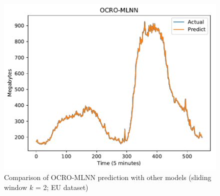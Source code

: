 \documentclass[11pt,twoside]{article}
\begin{document}
\begin{multicols}{2}
\begin{figure}[!ht]
\begin{minipage}[b]{0.33\linewidth}
    \includegraphics[width=0.9\linewidth]{predict/k2/eu_k2_ocro_mlnn.pdf} 
  \end{minipage} 
  
  \caption{Comparison of OCRO-MLNN prediction with other models (sliding window $k$ = 2; EU dataset)} 
  \label{predict_eu_sliding2} 
\end{figure}



\end{multicols}
\end{document}
